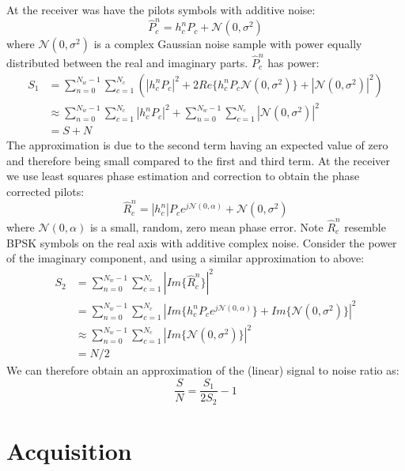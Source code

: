\documentclass{article}
\begin{document}
At the receiver was have the pilots symbols with additive noise:
\begin{equation}
\hat{P}_c^n = h_c^nP_c + \mathcal{N}(0,\sigma^2)
\end{equation}
where $\mathcal{N}(0,\sigma^2)$ is a complex Gaussian noise sample with power equally distributed between the real and imaginary parts. $\hat{P}_c^n $ has power:
\begin{equation}
\begin{split}
S_1 &= \sum_{n=0}^{N_w-1} \sum_{c=1}^{N_c} \left(|h_c^nP_c|^2 + 2Re\{h_c^nP_c\mathcal{N}(0,\sigma^2)\} + |\mathcal{N}(0,\sigma^2)|^2\right) \\
    &\approx \sum_{n=0}^{N_w-1} \sum_{c=1}^{N_c} |h_c^nP_c|^2 + \sum_{n=0}^{N_w-1} \sum_{c=1}^{N_c} |\mathcal{N}(0,\sigma^2)|^2 \\
    &= S + N
\end{split}
\end{equation} 
The approximation is due to the second term having an expected value of zero and therefore being small compared to the first and third term.  At the receiver we use least squares phase estimation and correction to obtain the phase corrected pilots:
\begin{equation}
\hat{R}_c^n = |h_c^n|P_c e^{j\mathcal{N}(0,\alpha)} + \mathcal{N}(0,\sigma^2)
\end{equation}
where $\mathcal{N}(0,\alpha)$ is a small, random, zero mean phase error. Note $\hat{R}_c^n$ resemble BPSK symbols on the real axis with additive complex noise. Consider the power of the imaginary component, and using a similar approximation to above: 
\begin{equation}
\begin{split}
S_2 &= \sum_{n=0}^{N_w-1} \sum_{c=1}^{N_c} |Im\{\hat{R}_c^n\}|^2 \\
    &= \sum_{n=0}^{N_w-1} \sum_{c=1}^{N_c} |Im\{h_c^nP_ce^{j\mathcal{N}(0,\alpha)}\} + Im\{\mathcal{N}(0,\sigma^2)\}|^2 \\
    &\approx \sum_{n=0}^{N_w-1} \sum_{c=1}^{N_c} |Im\{\mathcal{N}(0,\sigma^2)\}|^2 \\
    &= N/2
\end{split}
\end{equation}
We can therefore obtain an approximation of the (linear) signal to noise ratio as:
\begin{equation}
\frac{S}{N} = \frac{S_1}{2S_2} - 1
\end{equation}

\section{Acquisition}
\end{document}
